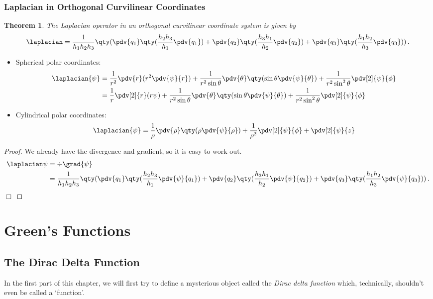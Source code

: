 \documentclass{article}
\theoremstyle{plain}\theoremheaderfont{\normalfont\itshape}\theorembodyfont{\rmfamily}\theoremseparator{.}\newtheorem*{rem}{Remark}\newtheorem*{ex}{Example}\newtheorem*{proof}{Proof}\newtheorem*{altp}{Alternative proof}
\theoremstyle{plain}\theoremheaderfont{\normalfont\bfseries}\theorembodyfont{\rmfamily}\theoremseparator{.}\newtheorem{thm}{Theorem}[section]\newtheorem{lem}[thm]{Lemma}\newtheorem{prop}[thm]{Proposition}\newtheorem*{cor}{Corollary}\newtheorem{defn}[thm]{Definition}\newtheorem{clm}[thm]{Claim}\newtheorem{clminproof}{Claim}
\theoremstyle{break}\theoremheaderfont{\normalfont\itshape}\theorembodyfont{\rmfamily}\theoremseparator{.\medskip}\newtheorem*{proofskip}{Proof}\newtheorem*{exs}{Examples}\newtheorem*{rems}{Remarks}
\theoremstyle{break}\theoremheaderfont{\normalfont\bfseries}\theorembodyfont{\rmfamily}\theoremseparator{.\medskip}\newtheorem{lemskip}[thm]{Lemma}\newtheorem{defnskip}[thm]{Definition}\newtheorem{propskip}[thm]{Proposition}\newtheorem{thmskip}[thm]{Theorem}
\numberwithin{equation}{section}
\newcommand{\qed}{\hfill\ensuremath{\Box}}
\begin{document}
	\subsubsection{Laplacian in Orthogonal Curvilinear Coordinates}
	\begin{thm}
		The Laplacian operator in an orthogonal curvilinear coordinate system is given by
		\[\laplacian=\frac{1}{h_1h_2h_3}\qty(\pdv{q_1}\qty(\frac{h_2h_3}{h_1}\pdv{q_1})+\pdv{q_2}\qty(\frac{h_3h_1}{h_2}\pdv{q_2})+\pdv{q_3}\qty(\frac{h_1h_2}{h_3}\pdv{q_3}))\,.\]
	\end{thm}
	\begin{itemize}
		\item Spherical polar coordinates:
		\begin{align*}
			\laplacian{\psi}&=\frac{1}{r^2}\pdv{r}(r^2\pdv{\psi}{r})+\frac{1}{r^2\sin\theta}\pdv{\theta}\qty(\sin\theta\pdv{\psi}{\theta})+\frac{1}{r^2\sin^2\theta}\pdv[2]{\psi}{\phi}\\
			&=\frac{1}{r}\pdv[2]{r}(r\psi)+\frac{1}{r^2\sin\theta}\pdv{\theta}\qty(\sin\theta\pdv{\psi}{\theta})+\frac{1}{r^2\sin^2\theta}\pdv[2]{\psi}{\phi}
		\end{align*}
		\item Cylindrical polar coordinates:
		\[\laplacian{\psi}=\frac{1}{\rho}\pdv{\rho} \qty(\rho\pdv{\psi}{\rho})+\frac{1}{\rho^2}\pdv[2]{\psi}{\phi}+\pdv[2]{\psi}{z}\]
	\end{itemize}
	\begin{proof}
		We already have the divergence and gradient, so it is easy to work out.
		\begin{align*}
			\laplacian\psi&=\div\grad{\psi}\\
			&=\frac{1}{h_1h_2h_3}\qty(\pdv{q_1}\qty(\frac{h_2h_3}{h_1}\pdv{\psi}{q_1})+\pdv{q_2}\qty(\frac{h_3h_1}{h_2}\pdv{\psi}{q_2})+\pdv{q_3}\qty(\frac{h_1h_2}{h_3}\pdv{\psi}{q_3}))\,.
		\end{align*}\qed
	\end{proof}
	\newpage

	\section{Green's Functions}
	\subsection{The Dirac Delta Function}
	In the first part of this chapter, we will first try to define a mysterious object called the \textit{Dirac delta function} which, technically, shouldn't even be called a `function'.
\end{document}
